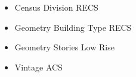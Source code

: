 \begin{itemize}
\item Census Division RECS
\item Geometry Building Type RECS
\item Geometry Stories Low Rise
\item Vintage ACS
\end{itemize}
